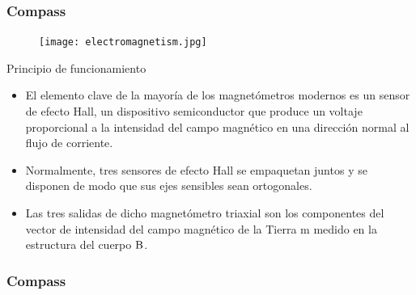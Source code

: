 \begin{frame}
    \frametitle{Compass}
    \scriptsize
    \begin{figure}[!h]
        \centering
        \texttt{[image: electromagnetism.jpg]}
    \end{figure}

    \begin{block}{Principio de funcionamiento}
        \begin{itemize}
        \item El elemento clave de la mayoría de los magnetómetros modernos es un sensor de efecto Hall, un dispositivo semiconductor que produce un voltaje proporcional a la intensidad del campo magnético en una dirección normal al flujo de corriente.
        \item Normalmente, tres sensores de efecto Hall se empaquetan juntos y se disponen de modo que sus ejes sensibles sean ortogonales.
        \item Las tres salidas de dicho magnetómetro triaxial son los componentes del vector de intensidad del campo magnético de la Tierra m medido en la estructura del cuerpo $\mathrm{B}$.
        \end{itemize}
    \end{block}
\end{frame}

\begin{frame}
    \frametitle{Compass}
    \begin{figure}[!h]
        \centering
        \\
    \end{figure}
\end{frame}


